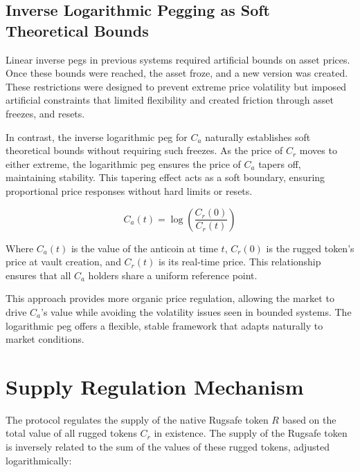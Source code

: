 \documentclass{article}
\begin{document}
\subsection{Inverse Logarithmic Pegging as Soft Theoretical Bounds}

Linear inverse pegs in previous systems required artificial bounds on asset prices. Once these bounds were reached, the asset froze, and a new version was created. These restrictions were designed to prevent extreme price volatility but imposed artificial constraints that limited flexibility and created friction through asset freezes, and resets.

In contrast, the inverse logarithmic peg for $C_a$ naturally establishes soft theoretical bounds without requiring such freezes. As the price of $C_r$ moves to either extreme, the logarithmic peg ensures the price of $C_a$ tapers off, maintaining stability. This tapering effect acts as a soft boundary, ensuring proportional price responses without hard limits or resets.

\[
C_{a}(t) = \log\left(\frac{C_{r}(0)}{C_{r}(t)}\right)
\]

Where \( C_{a}(t) \) is the value of the anticoin at time \( t \), \( C_{r}(0) \) is the rugged token's price at vault creation, and \( C_{r}(t) \) is its real-time price. This relationship ensures that all $C_a$ holders share a uniform reference point.

This approach provides more organic price regulation, allowing the market to drive $C_a$’s value while avoiding the volatility issues seen in bounded systems. The logarithmic peg offers a flexible, stable framework that adapts naturally to market conditions.












\section{Supply Regulation Mechanism}
The protocol regulates the supply of the native Rugsafe token $R$ based on the total value of all rugged tokens $C_r$ in existence. The supply of the Rugsafe token is inversely related to the sum of the values of these rugged tokens, adjusted logarithmically:
\end{document}
